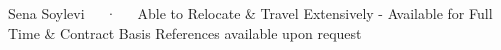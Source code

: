 \documentclass[11pt, a4paper]{awesome-cv}
\begin{document}
\makecvheader[C]

\makecvfooter
  {}
  {Sena Soylevi~~~·~~~Able to Relocate & Travel Extensively - Available for Full Time & Contract Basis References available upon request}
  {\thepage}






% 
% 

% 
% 
% 
% 
% 


\end{document}
